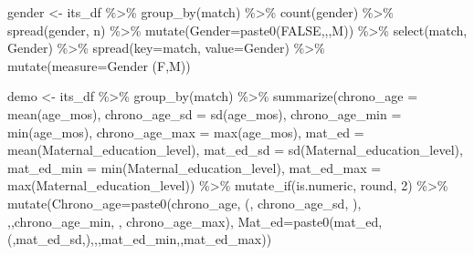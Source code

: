 \documentclass[
]{article}
\newenvironment{Shaded}{\begin{snugshade}}{\end{snugshade}}
\newcommand{\AttributeTok}[1]{\textcolor[rgb]{0.77,0.63,0.00}{#1}}
\newcommand{\DecValTok}[1]{\textcolor[rgb]{0.00,0.00,0.81}{#1}}
\newcommand{\FunctionTok}[1]{\textcolor[rgb]{0.00,0.00,0.00}{#1}}
\newcommand{\NormalTok}[1]{#1}
\newcommand{\OtherTok}[1]{\textcolor[rgb]{0.56,0.35,0.01}{#1}}
\newcommand{\SpecialCharTok}[1]{\textcolor[rgb]{0.00,0.00,0.00}{#1}}
\newcommand{\StringTok}[1]{\textcolor[rgb]{0.31,0.60,0.02}{#1}}
\begin{document}
\begin{Shaded}
\begin{Highlighting}[]
\NormalTok{gender }\OtherTok{\textless{}{-}}\NormalTok{ its\_df }\SpecialCharTok{\%\textgreater{}\%}
  \FunctionTok{group\_by}\NormalTok{(match) }\SpecialCharTok{\%\textgreater{}\%}
  \FunctionTok{count}\NormalTok{(gender) }\SpecialCharTok{\%\textgreater{}\%}
  \FunctionTok{spread}\NormalTok{(gender, n) }\SpecialCharTok{\%\textgreater{}\%}
  \FunctionTok{mutate}\NormalTok{(}\AttributeTok{Gender=}\FunctionTok{paste0}\NormalTok{(}\StringTok{\textasciigrave{}}\AttributeTok{FALSE}\StringTok{\textasciigrave{}}\NormalTok{,}\StringTok{\textquotesingle{},\textquotesingle{}}\NormalTok{,M)) }\SpecialCharTok{\%\textgreater{}\%}
  \FunctionTok{select}\NormalTok{(match, Gender) }\SpecialCharTok{\%\textgreater{}\%}
  \FunctionTok{spread}\NormalTok{(}\AttributeTok{key=}\StringTok{\textquotesingle{}match\textquotesingle{}}\NormalTok{, }\AttributeTok{value=}\StringTok{\textquotesingle{}Gender\textquotesingle{}}\NormalTok{) }\SpecialCharTok{\%\textgreater{}\%}
  \FunctionTok{mutate}\NormalTok{(}\AttributeTok{measure=}\StringTok{\textquotesingle{}Gender (F,M)\textquotesingle{}}\NormalTok{)}

\NormalTok{demo }\OtherTok{\textless{}{-}}\NormalTok{ its\_df }\SpecialCharTok{\%\textgreater{}\%}
  \FunctionTok{group\_by}\NormalTok{(match) }\SpecialCharTok{\%\textgreater{}\%}
  \FunctionTok{summarize}\NormalTok{(}\AttributeTok{chrono\_age =} \FunctionTok{mean}\NormalTok{(age\_mos),}
            \AttributeTok{chrono\_age\_sd =} \FunctionTok{sd}\NormalTok{(age\_mos),}
            \AttributeTok{chrono\_age\_min =} \FunctionTok{min}\NormalTok{(age\_mos),}
            \AttributeTok{chrono\_age\_max =} \FunctionTok{max}\NormalTok{(age\_mos),}
            \AttributeTok{mat\_ed =} \FunctionTok{mean}\NormalTok{(Maternal\_education\_level),}
            \AttributeTok{mat\_ed\_sd =} \FunctionTok{sd}\NormalTok{(Maternal\_education\_level),}
            \AttributeTok{mat\_ed\_min =} \FunctionTok{min}\NormalTok{(Maternal\_education\_level),}
            \AttributeTok{mat\_ed\_max =} \FunctionTok{max}\NormalTok{(Maternal\_education\_level)) }\SpecialCharTok{\%\textgreater{}\%}
    \FunctionTok{mutate\_if}\NormalTok{(is.numeric, round, }\DecValTok{2}\NormalTok{) }\SpecialCharTok{\%\textgreater{}\%}
  \FunctionTok{mutate}\NormalTok{(}\AttributeTok{Chrono\_age=}\FunctionTok{paste0}\NormalTok{(chrono\_age, }\StringTok{\textquotesingle{}(\textquotesingle{}}\NormalTok{, chrono\_age\_sd, }\StringTok{\textquotesingle{})\textquotesingle{}}\NormalTok{, }\StringTok{\textquotesingle{},\textquotesingle{}}\NormalTok{,chrono\_age\_min, }\StringTok{\textquotesingle{}{-}\textquotesingle{}}\NormalTok{, chrono\_age\_max),}
         \AttributeTok{Mat\_ed=}\FunctionTok{paste0}\NormalTok{(mat\_ed,}\StringTok{\textquotesingle{}(\textquotesingle{}}\NormalTok{,mat\_ed\_sd,}\StringTok{\textquotesingle{})\textquotesingle{}}\NormalTok{,}\StringTok{\textquotesingle{},\textquotesingle{}}\NormalTok{,mat\_ed\_min,}\StringTok{\textquotesingle{}{-}\textquotesingle{}}\NormalTok{,mat\_ed\_max)) }


\end{Highlighting}
\end{Shaded}
\end{document}
